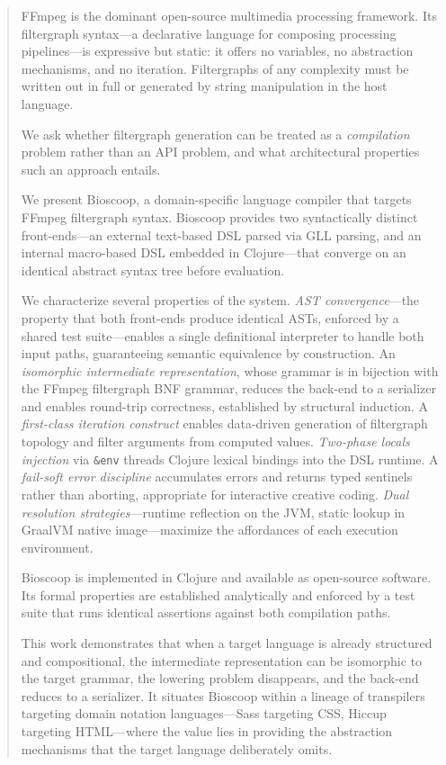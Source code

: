 \documentclass[english,submission]{programming}
\begin{document}
\begin{abstract}
FFmpeg is the dominant open-source multimedia processing framework. Its filtergraph
syntax---a declarative language for composing processing pipelines---is expressive but
static: it offers no variables, no abstraction mechanisms, and no iteration. Filtergraphs of
any complexity must be written out in full or generated by string manipulation in the
host language.

We ask whether filtergraph generation can be treated as a \emph{compilation} problem
rather than an API problem, and what architectural properties such an approach entails.

We present Bioscoop, a domain-specific language compiler that targets FFmpeg filtergraph
syntax. Bioscoop provides two syntactically distinct front-ends---an external text-based DSL
parsed via GLL parsing, and an internal macro-based DSL embedded in Clojure---that
converge on an identical abstract syntax tree before evaluation.

We characterize several properties of the system. \emph{AST convergence}---the property
that both front-ends produce identical ASTs, enforced by a shared test suite---enables a
single definitional interpreter to handle both input paths, guaranteeing semantic equivalence
by construction. An \emph{isomorphic intermediate representation}, whose grammar is in
bijection with the FFmpeg filtergraph BNF grammar, reduces the back-end to a serializer
and enables round-trip correctness, established by structural induction. A \emph{first-class
iteration construct} enables data-driven generation of filtergraph topology and filter
arguments from computed values. \emph{Two-phase locals injection} via \texttt{\&env} threads
Clojure lexical bindings into the DSL runtime. A \emph{fail-soft error discipline} accumulates
errors and returns typed sentinels rather than aborting, appropriate for interactive creative
coding. \emph{Dual resolution strategies}---runtime reflection on the JVM, static lookup in
GraalVM native image---maximize the affordances of each execution environment.

Bioscoop is implemented in Clojure and available as open-source software. Its formal
properties are established analytically and enforced by a test suite that runs identical
assertions against both compilation paths.

This work demonstrates that when a target language is already structured and compositional,
the intermediate representation can be isomorphic to the target grammar, the lowering
problem disappears, and the back-end reduces to a serializer. It situates Bioscoop within a
lineage of transpilers targeting domain notation languages---Sass targeting CSS, Hiccup
targeting HTML---where the value lies in providing the abstraction mechanisms that the
target language deliberately omits.
\end{abstract}
\end{document}

